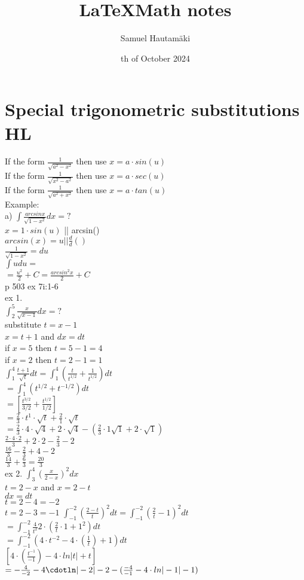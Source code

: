 \documentclass{article}
\title{\LaTeX Math notes}
\author{Samuel Hautamäki}
\date{th of October 2024}
\begin{document}
  \maketitle
   
  \section{Special trigonometric substitutions HL}
  If the form $\frac{1}{\sqrt{a^2-x^2}}$ then use $x=a\cdot sin(u)$\\
  If the form $\frac{1}{\sqrt{x^2-a^2}}$ then use $x=a\cdot sec(u)$\\
  If the form $\frac{1}{\sqrt{a^2+x^2}}$ then use $x=a\cdot tan(u)$\\
  Example:\\
  a) $\int \frac{arcsin x}{\sqrt{1-x^2}}dx =?$\\
  $x=1\cdot sin(u)$ || arcsin()\\
  $arcsin(x)=u || \frac{d}{d}()$\\
  $\frac{1}{\sqrt{1-x^2}}=du$\\
  $\int u du = $\\
  $= \frac{u^2}{2}+C=\frac{arcsin^2x}{2}+C$\\
  p 503 ex 7i:1-6\\
  ex 1.\\
  $\int_{2}^{5}\frac{x}{\sqrt{x-1}}dx=?$\\
  substitute $t=x-1$\\
  $x=t+1$ and $dx=dt$\\
  if $x=5$ then $t=5-1=4$\\
  if $x=2$ then $t=2-1=1$\\
  $\int_{1}^{4}\frac{t+1}{\sqrt{t}}dt=\int_{1}^{4}(\frac{t}{t^{1/2}}+\frac{1}{t^{1/2}})dt$\\
  $=\int_{1}^{4}(t^{1/2}+t^{-1/2})dt$\\
  $=[ \frac{t^{3/2}}{3/2}+\frac{t^{1/2}}{1/2}]$\\
  $=\frac{2}{3}\cdot t^1\cdot \sqrt{t}+\frac{2}{1}\cdot\sqrt{t}$\\
  $=\frac{2}{3}\cdot4\cdot\sqrt{4}+2\cdot\sqrt{4}-(\frac{2}{3}\cdot1\sqrt{1}+2\cdot\sqrt{1})$\\
  $\frac{2\cdot4\cdot2}{3}+2\cdot2-\frac{2}{3}-2$\\
  $\frac{16}{3}-\frac{2}{3}+4-2$\\
  $\frac{14}{3}+\frac{6}{3}=\frac{20}{3}$\\
  ex 2. $\int_{3}^{4}(\frac{x}{2-x})^2dx$\\
  $t=2-x$ and $x=2-t$\\
  $dx=dt$\\
  $t=2-4=-2$\\
  $t=2-3=-1$
  $\int_{-1}^{-2}(\frac{2-t}{t})^2dt=\int_{-1}^{-2}(\frac{2}{t}-1)^2dt$\\
  $=\int_{-1}^{-2}\frac{4}{t^2}2\cdot(\frac{2}{t}\cdot1+1^2)dt$\\
  $=\int_{-1}^{-2}(4\cdot t^{-2}-4\cdot(\frac{1}{t})+1)dt$\\
  $[ 4\cdot (\frac{t^{-1}}{-1})-4\cdot ln|t|+t]$\\
  $=-\frac{4}{-2}-4\cdotln|-2|-2-(\frac{-4}{-1}-4\cdot ln|-1|-1)$\\

   
\end{document}
